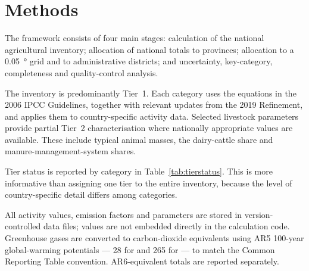 \section{Methods}
\label{sec:methods}

The framework consists of four main stages: calculation of the national agricultural
inventory; allocation of national totals to provinces; allocation to a \SI{0.05}{\degree}
grid and to administrative districts; and uncertainty, key-category, completeness and
quality-control analysis.

The inventory is predominantly Tier~1. Each category uses the equations in the 2006 IPCC
Guidelines, together with relevant updates from the 2019 Refinement, and applies them to
country-specific activity data. Selected livestock parameters provide partial Tier~2
characterisation where nationally appropriate values are available. These include typical
animal masses, the dairy-cattle share and manure-management-system shares.

Tier status is reported by category in Table~\ref{tab:tierstatus}. This is more informative
than assigning one tier to the entire inventory, because the level of country-specific
detail differs among categories.

All activity values, emission factors and parameters are stored in version-controlled data
files; values are not embedded directly in the calculation code. Greenhouse gases are
converted to carbon-dioxide equivalents using AR5 100-year global-warming potentials ---
28 for \CHfour{} and 265 for \NtwoO{} --- to match the Common Reporting Table convention.
AR6-equivalent totals are reported separately.

